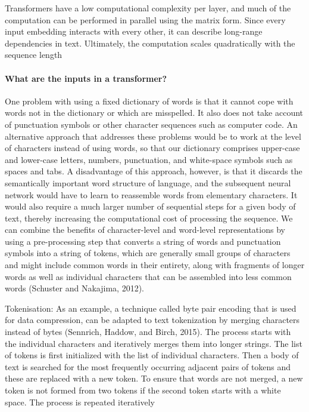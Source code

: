 Transformers have a low computational complexity per layer,
and much of the computation can be performed in parallel using the matrix form. Since
every input embedding interacts with every other, it can describe long-range dependencies
in text. Ultimately, the computation scales quadratically with the sequence length

\paragraph{What are the inputs in a transformer?}

One problem with using a fixed dictionary of words is that it cannot cope with
words not in the dictionary or which are misspelled. It also does not take account
of punctuation symbols or other character sequences such as computer code. An
alternative approach that addresses these problems would be to work at the level of
characters instead of using words, so that our dictionary comprises upper-case and
lower-case letters, numbers, punctuation, and white-space symbols such as spaces
and tabs. A disadvantage of this approach, however, is that it discards the semantically
important word structure of language, and the subsequent neural network would
have to learn to reassemble words from elementary characters. It would also require
a much larger number of sequential steps for a given body of text, thereby increasing
the computational cost of processing the sequence.
We can combine the benefits of character-level and word-level representations
by using a pre-processing step that converts a string of words and punctuation symbols
into a string of tokens, which are generally small groups of characters and might
include common words in their entirety, along with fragments of longer words as
well as individual characters that can be assembled into less common words (Schuster and Nakajima, 2012).

Tokenisation: As an example, a technique called
byte pair encoding that is used for data compression, can be adapted to text tokenization
by merging characters instead of bytes (Sennrich, Haddow, and Birch, 2015).
The process starts with the individual characters and iteratively merges them into
longer strings. The list of tokens is first initialized with the list of individual characters.
Then a body of text is searched for the most frequently occurring adjacent
pairs of tokens and these are replaced with a new token. To ensure that words are not
merged, a new token is not formed from two tokens if the second token starts with a
white space. The process is repeated iteratively

